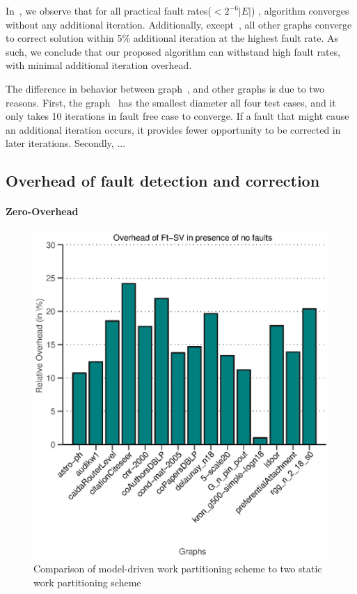 In~, we observe that for all practical fault rates($<2^{-6}|E|$) , algorithm converges without any additional iteration.
Additionally, except~, all other graphs converge to correct solution within 5\% additional iteration at the highest fault rate. As such, we conclude that our proposed algorithm can withstand high fault rates, with minimal additional iteration overhead.   

The difference in behavior between graph~, and other graphs is due to two reasons. First, the graph~ has  the smallest diameter all four test cases, and it only takes 10 iterations in fault free case to converge. If a fault that might cause an additional iteration occurs, it provides fewer opportunity to be corrected in later iterations. Secondly, ...

\subsection{Overhead of fault detection and correction}
\paragraph{Zero-Overhead}

\begin{figure}[tbp]
\includegraphics[width=.6\textwidth]{plots/plot_zero_overhead.eps}
\caption{\label{fig:con-plot} 
\small Comparison of model-driven work partitioning scheme to
two static work partitioning scheme}
\end{figure}

